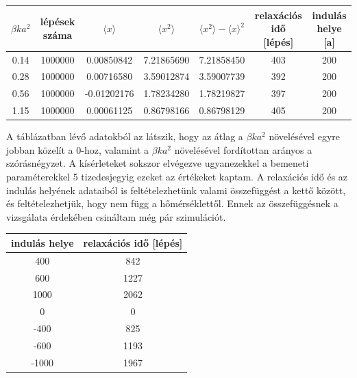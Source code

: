 \documentclass[12pt]{article}
\begin{document}
\begin{center}
\begin{tabular}{ |c|c|c|c|c|c|c|} 
 \hline
 $\beta k a^2$& lépések száma & $\langle x \rangle$ & $\langle x^2\rangle$& $\langle x^2\rangle - \langle x \rangle ^2$& relaxációs idő [lépés] & indulás helye [a] \\ \hline
 0.14 & 1000000 & 0.00850842&7.21865690 &7.21858450 &403&200\\ \hline
 0.28 & 1000000 & 0.00716580 & 3.59012874 &3.59007739 &392&200\\ \hline
 0.56 & 1000000&-0.01202176&1.78234280& 1.78219827&397&200\\ \hline
 1.15&1000000&0.00061125&0.86798166&0.86798129&405&200 \\
 \hline
\end{tabular}
\end{center}
A táblázatban lévő adatokból az látszik, hogy az átlag a $\beta ka^2$ növelésével egyre jobban közelít a 0-hoz, valamint a $\beta ka^2$ növelésével fordítottan arányos  a szórásnégyzet. A kísérleteket sokszor elvégezve ugyanezekkel a bemeneti paraméterekkel 5 tizedesjegyig ezeket az értékeket kaptam. A relaxációs idő és az indulás helyének adataiból is feltételezhetünk valami összefüggést a kettő között, és feltételezhetjük, hogy nem függ a hőmérséklettől. Ennek az összefüggésnek a vizsgálata érdekében csináltam még pár szimulációt.
\begin{center}
\begin{tabular}{ |c|c|} 
 \hline
indulás helye &relaxációs idő [lépés] \\ \hline
400&842\\ \hline
600& 1227\\ \hline
1000&2062\\ \hline
0& 0\\ \hline
-400&825\\ \hline
-600&1193\\ \hline
-1000& 1967\\ \hline

\end{tabular}
\end{center}
\end{document}
